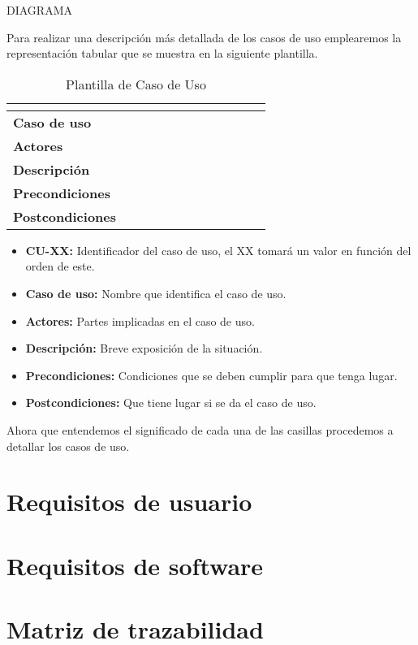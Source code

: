 DIAGRAMA

Para realizar una descripción más detallada de los casos de uso emplearemos la representación tabular que se muestra en la siguiente plantilla.
\begin{table}[H]
    \centering
    \caption{Plantilla de Caso de Uso}
    \begin{tabular}{|l|l|}
    \hline
    \multicolumn{2}{|c|}{\cellcolor[HTML]{BFBFBF}{\color[HTML]{000000} \textbf{CU-XX}}} \\ \hline
    \textbf{Caso de uso} & $\quad\quad\quad\quad\quad\quad\quad\quad\quad\quad$ \\ \hline
    \textbf{Actores} &  \\ \hline
    \textbf{Descripción} &  \\ \hline
    \textbf{Precondiciones} &  \\ \hline
    \textbf{Postcondiciones} &  \\ \hline
    \end{tabular}
\end{table}

\begin{itemize}
    \item \textbf{CU-XX:} Identificador del caso de uso, el XX tomará un valor en función del orden de este.
    \item \textbf{Caso de uso:} Nombre que identifica el caso de uso.
    \item \textbf{Actores:} Partes implicadas en el caso de uso.
    \item \textbf{Descripción:} Breve exposición de la situación.
    \item \textbf{Precondiciones:} Condiciones que se deben cumplir para que tenga lugar.
    \item \textbf{Postcondiciones:} Que tiene lugar si se da el caso de uso.
\end{itemize}

Ahora que entendemos el significado de cada una de las casillas procedemos a detallar los casos de uso.

\section{Requisitos de usuario}

\section{Requisitos de software}

\section{Matriz de trazabilidad}